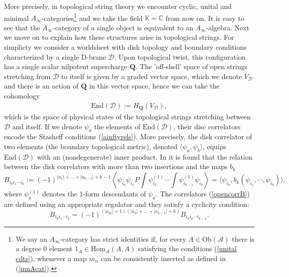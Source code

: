 \documentclass[a4paper,11pt]{article}
\numberwithin{equation}{section}
\begin{document}
More precisely, in topological string theory we encounter cyclic, unital and 
minimal 
$A_{\infty}$-categories\footnote{We say an $A_{\infty}$-category has strict 
identities if, for every $A\in \mathrm{Ob}(\mathcal{A})$ there is a degree $0$ 
element $1_{A}\in \mathrm{Hom}_{\mathcal{A}}(A,A)$ satisfying the conditions  
(\ref{unital cdts}),  whenever a map $m_{n}$ can be consistently inserted as 
defined in (\ref{mnAcat}).} and we take the field 
$\mathbb{K}=\mathbb{C}$ from now on. It is easy to see that the 
$A_{\infty}$-category of a single object is equivalent to an 
$A_{\infty}$-algebra. Next we move on to explain how these structures arise in 
topological strings. For simplicty we consider a worldsheet with disk topology 
and 
boundary conditions characterized by a single D-brane $\mathcal{D}$. Upon 
topological twist, this configuration has a single scalar nilpotent supercharge 
$\mathbf{Q}$. The 'off-shell' space of open strings stretching from 
$\mathcal{D}$ to itself is given by a graded vector space, which we denote 
$V_{\mathcal{D}}$ and there is an action of $\mathbf{Q}$ in this vector space, 
hence we can take the cohomology 
\begin{eqnarray}
\mathrm{End}(\mathcal{D}):=H_{\mathbf{Q}}(V_{\mathcal{D}}),
\end{eqnarray}
which is the 
space of physical states of the topological strings stretching between 
$\mathcal{D}$ and itself. If we denote 
$\psi_{a}$ the elements of $\mathrm{End}(\mathcal{D})$, their disc correlators 
encode the Stasheff conditions (\ref{ainftyrels}). More precisely, the disk 
correlator of two elements (the boundary topological metric), denoted $\langle 
\psi_{a},\psi_{b}\rangle$, equips $\mathrm{End}(\mathcal{D})$ with an 
(nondegenerate) inner product. In \cite{Hofman:2000ce,Herbst:2004jp} it is 
found that the relation 
between the 
disk correlators with more than two insertions and the maps $b_{k}$
\begin{equation}\label{opencorrB}
B_{i_0 i_1\cdots i_k} := (-1)^{|a_{1}|+\ldots+|a_{k-1}|+k-1} \left\langle 
\psi_{i_0} 
\psi_{i_1} P \int \psi^{(1)}_{i_2} \cdots \int \psi^{(1)}_{i_{k-1}} \psi_{i_k} 
\right\rangle = \langle \psi_{i_{0}},b_k(\psi_{i_1},\cdots,\psi_{i_{k}})\rangle,
\end{equation}
where $\psi^{(1)}_{a}$ denotes the 1-form descendants of $\psi_{a}$. The 
correlators (\ref{opencorrB}) are defined using an appropriate regulator 
\cite{Herbst:2004jp} and they satisfy a cyclicity condition:
\begin{equation}
B_{i_0 i_1\cdots i_k} =(-1)^{(|a_{m}|+1)(|a_{0}|+\ldots+|a_{k-1}|+k)}B_{i_k 
i_0\cdots i_{k-1}}.
\end{equation}
\end{document}

